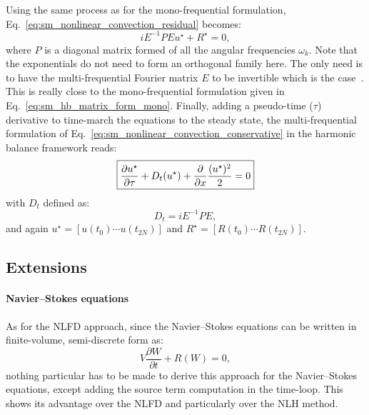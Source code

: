 Using the same process as for the mono-frequential formulation,
Eq.~\eqref{eq:sm_nonlinear_convection_residual} becomes:
\begin{equation}
	i E^{-1} P E u^\star + R^\star = 0,
\end{equation}
where $P$ is a diagonal matrix formed of all the angular frequencies $\omega_k$.
Note that the exponentials do not need to form an
orthogonal family here. The only need is to have the multi-frequential
Fourier matrix $E$ to be invertible which is the case~\cite{Ekici2007}.
This is really close to the mono-frequential formulation given
in Eq.~\eqref{eq:sm_hb_matrix_form_mono}.
Finally, adding a pseudo-time ($\tau$) derivative 
to time-march the equations to the steady state,
the multi-frequential formulation of 
Eq.~\eqref{eq:sm_nonlinear_convection_conservative} in the harmonic
balance framework reads:
\begin{equation}
	\fbox{$
	\displaystyle \frac{\partial u^\star}{\partial \tau} +
	D_t (u^\star) + 
	\displaystyle \frac{\partial}{\partial x}
		\frac{(u^\star)^2}{2} = 0
	$}
\end{equation}
with $D_t$ defined as:
\begin{equation}
	D_t = i E^{-1} P E,
	\label{eq:sm_multi_spectral_operator}
\end{equation}
and again $u^\star = [u(t_0) \cdots u(t_{2N})]$ 
and $R^\star = [R(t_0) \cdots R(t_{2N})]$.

\subsection{Extensions}
\label{sec:sm_hb_extension}

\paragraph{Navier--Stokes equations}
As for the NLFD approach, since the 
Navier--Stokes equations can be written in finite-volume,
semi-discrete form as:
\begin{equation}
	V \frac{\partial W}{\partial t} + R(W) = 0,
\end{equation}
nothing particular has to be made to derive this approach for
the Navier--Stokes equations, except adding the source term computation
in the time-loop.
This shows its advantage over the NLFD and particularly over the NLH method.

